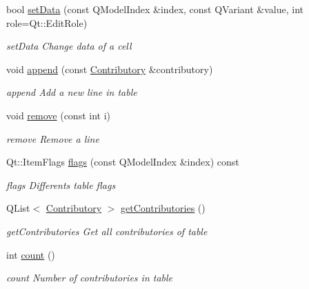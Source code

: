 \begin{DoxyCompactItemize}
bool \hyperlink{classGui_1_1Widgets_1_1WdgModels_1_1ContributoriesTableModel_a1c9f7969dc52e5840acfc122fcb2ab48}{set\-Data} (const Q\-Model\-Index \&index, const Q\-Variant \&value, int role=Qt\-::\-Edit\-Role)
\begin{DoxyCompactList}\small\item\em set\-Data Change data of a cell \end{DoxyCompactList}\item 
void \hyperlink{classGui_1_1Widgets_1_1WdgModels_1_1ContributoriesTableModel_a6d3f0ab976abd9993b731b27fbe3a404}{append} (const \hyperlink{classModels_1_1Contributory}{Contributory} \&contributory)
\begin{DoxyCompactList}\small\item\em append Add a new line in table \end{DoxyCompactList}\item 
void \hyperlink{classGui_1_1Widgets_1_1WdgModels_1_1ContributoriesTableModel_a76666bbbc940867b6ff3366424f72e26}{remove} (const int i)
\begin{DoxyCompactList}\small\item\em remove Remove a line \end{DoxyCompactList}\item 
Qt\-::\-Item\-Flags \hyperlink{classGui_1_1Widgets_1_1WdgModels_1_1ContributoriesTableModel_a6bf3e8c45bb499e82546be456a7de77b}{flags} (const Q\-Model\-Index \&index) const 
\begin{DoxyCompactList}\small\item\em flags Differents table flags \end{DoxyCompactList}\item 
Q\-List$<$ \hyperlink{classModels_1_1Contributory}{Contributory} $>$ \hyperlink{classGui_1_1Widgets_1_1WdgModels_1_1ContributoriesTableModel_af20bc21f24f7597b6b7d053d11d02d97}{get\-Contributories} ()
\begin{DoxyCompactList}\small\item\em get\-Contributories Get all contributories of table \end{DoxyCompactList}\item 
int \hyperlink{classGui_1_1Widgets_1_1WdgModels_1_1ContributoriesTableModel_acc01a97c00bb57e6733f697fc45be0ed}{count} ()
\begin{DoxyCompactList}\small\item\em count Number of contributories in table \end{DoxyCompactList}\end{DoxyCompactItemize}


